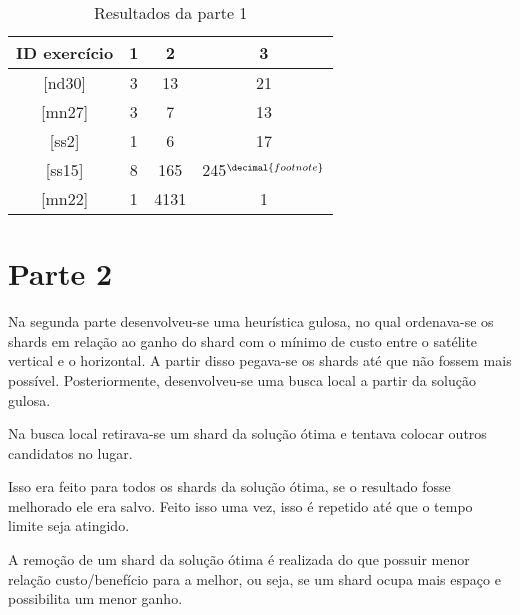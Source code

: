 \documentclass[11pt,letterpaper]{article}
\begin{document}
\begin{table}[h!]
\begin{centering}
\begin{tabular}{|c|c|c|c|}
\hline 
ID exercício & 1 & 2 & 3\tabularnewline
\hline 
\hline 
{[}nd30{]}  & 3 & 13  & 21 \tabularnewline
\hline 
 {[}mn27{]} & 3 & 7 & 13 \tabularnewline
\hline 
 {[}ss2{]} & 1 & 6  & 17 \tabularnewline
\hline 
{[}ss15{]} & 8 & 165  & 245$^{\decimal{footnote}}$\addtocounter{footnote}{1}  \tabularnewline
\hline 
 {[}mn22{]} & 1 & 4131  & 1 \tabularnewline
\hline 
\end{tabular}
\par\end{centering}
\caption{Resultados da parte 1}
\end{table}

\addtocounter{footnote}{-1} 
\section{Parte 2}

Na segunda parte desenvolveu-se uma heurística gulosa, no qual
ordenava-se os shards em relação ao ganho do shard com o mínimo de
custo entre o satélite vertical e o horizontal.
A partir disso pegava-se os shards até que não fossem mais possível.
Posteriormente, desenvolveu-se uma busca local a partir da solução
gulosa.

Na busca local retirava-se um shard da solução ótima e tentava colocar
outros candidatos no lugar.

Isso era feito para todos os shards da solução ótima, se o resultado
fosse melhorado ele era salvo. Feito isso uma vez, isso é repetido até
que o tempo limite seja atingido.

A remoção de um shard da solução ótima é realizada do que possuir
menor relação custo/benefício para a melhor, ou seja, se um shard
ocupa mais espaço e possibilita um menor ganho.
\end{document}
